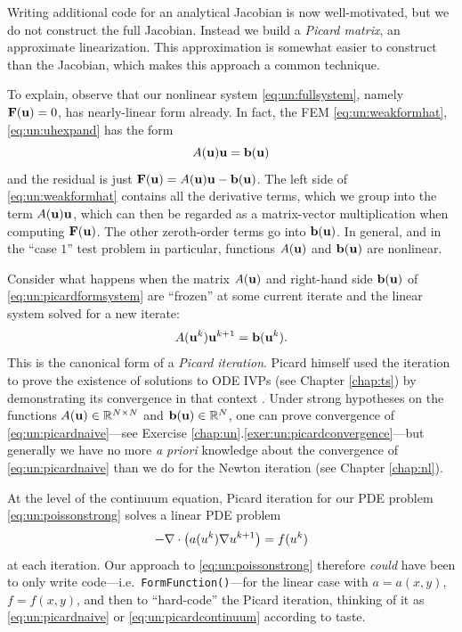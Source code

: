 Writing additional code for an analytical Jacobian is now well-motivated, but we do not construct the full Jacobian.  Instead we build a \emph{Picard matrix}, an approximate linearization.  This approximation is somewhat easier to construct than the Jacobian, which makes this approach a common technique.

To explain, observe that our nonlinear system \eqref{eq:un:fullsystem}, namely $\mathbf{F}(\mathbf{u})=0$, has nearly-linear form already.  In fact, the FEM \eqref{eq:un:weakformhat}, \eqref{eq:un:uhexpand} has the form
\begin{equation}
A(\mathbf{u}) \mathbf{u} = \mathbf{b}(\mathbf{u}) \label{eq:un:picardformsystem}
\end{equation}
and the residual is just $\mathbf{F}(\mathbf{u}) = A(\mathbf{u}) \mathbf{u} - \mathbf{b}(\mathbf{u})$.  The left side of \eqref{eq:un:weakformhat} contains all the derivative terms, which we group into the term $A(\mathbf{u}) \mathbf{u}$, which can then be regarded as a matrix-vector multiplication when computing $\mathbf{F}(\mathbf{u})$.  The other zeroth-order terms go into $\mathbf{b}(\mathbf{u})$.  In general, and in the ``case $1$'' test problem in particular, functions $A(\mathbf{u})$ and $\mathbf{b}(\mathbf{u})$ are nonlinear.

Consider what happens when the matrix $A(\mathbf{u})$ and right-hand side $\mathbf{b}(\mathbf{u})$ of \eqref{eq:un:picardformsystem} are ``frozen'' at some current iterate and the linear system solved for a new iterate:
\begin{equation}
A(\mathbf{u}^k) \mathbf{u}^{k+1} = \mathbf{b}(\mathbf{u}^k). \label{eq:un:picardnaive}
\end{equation}
This is the canonical form of a \emph{Picard iteration}.  Picard himself used the iteration to prove the existence of solutions to ODE IVPs (see Chapter \ref{chap:ts}) by demonstrating its convergence in that context \citep{HirschSmaleDevaney2004}.  Under strong hypotheses on the functions $A(\mathbf{u})\in\mathbb{R}^{N\times N}$ and $\mathbf{b}(\mathbf{u})\in\mathbb{R}^{N}$, one can prove convergence of \eqref{eq:un:picardnaive}---see Exercise \ref{chap:un}.\ref{exer:un:picardconvergence}---but generally we have no more \emph{a priori} knowledge about the convergence of \eqref{eq:un:picardnaive} than we do for the Newton iteration (see Chapter \ref{chap:nl}).

At the level of the continuum equation, Picard iteration for our PDE problem \eqref{eq:un:poissonstrong} solves a linear PDE problem
\begin{equation}
-\nabla\cdot\left(a(u^k) \nabla u^{k+1}\right) = f(u^k) \label{eq:un:picardcontinuum}
\end{equation}
at each iteration.  Our approach to \eqref{eq:un:poissonstrong} therefore \emph{could} have been to only write code---i.e.~\texttt{FormFunction()}---for the linear case with $a=a(x,y)$, $f=f(x,y)$, and then to ``hard-code'' the Picard iteration, thinking of it as \eqref{eq:un:picardnaive} or \eqref{eq:un:picardcontinuum} according to taste.

